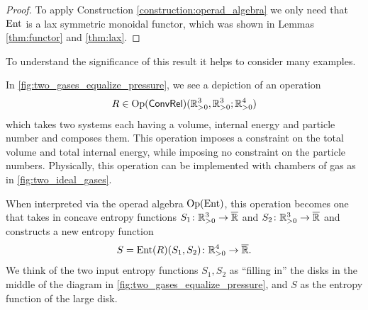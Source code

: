 \documentclass[12pt, reqno]{amsart}
\DeclareMathOperator{\Op}{Op}
\newcommand{\pos}{\real_{> 0}}
\newcommand{\extreal}{\overline{\real}}
\newcommand{\convrelC}{\cat{ConvRel}}
\begin{document}
\begin{proof}
To apply Construction \ref{construction:operad_algebra} we only need that $\mathrm{Ent}$ is a lax symmetric monoidal functor, which was shown in Lemmas \ref{thm:functor} and \ref{thm:lax}.
\end{proof}

To understand the significance of this result it helps to consider many examples.

\begin{example}
    In \cref{fig:two_gases_equalize_pressure}, we see a depiction of an operation 
    \[  R \in \Op(\convrelC)(\pos^3, \pos^3; \pos^4) \] 
    which takes two systems each having a volume, internal energy and particle number and composes them. This operation imposes a constraint on the total volume and total internal energy, while imposing no constraint on the particle numbers. Physically, this operation can be implemented with chambers of gas as in \cref{fig:two_ideal_gases}.
    
    When interpreted via the operad algebra $\Op(\Ent)$, this operation becomes one that takes in concave entropy functions $S_1 \maps \pos^3 \to \extreal$ and $S_2 \maps \pos^3 \to \extreal$ and constructs a new entropy function 
    \[ S = \Ent(R)(S_1, S_2) \maps \pos^4 \to \extreal. 
    \] We think of the two input entropy functions $S_1, S_2$ as ``filling in'' the disks in the middle of the diagram in \cref{fig:two_gases_equalize_pressure}, and $S$ as the entropy function of the large disk.
    

\end{example}
\end{document}

